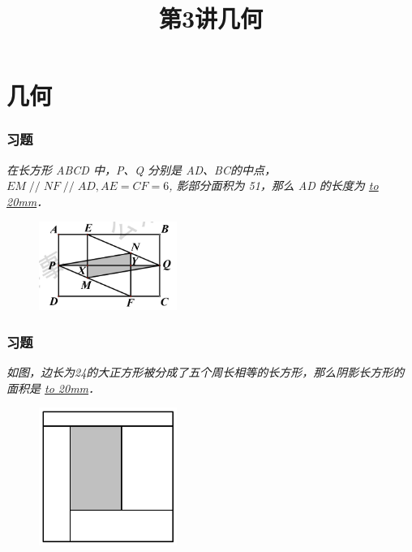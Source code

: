 \section{几何}

\title[第3讲\quad 几何]{第3讲\quad 几何} 
\author{}
\date{}

\begin{frame}
    \titlepage
\end{frame}

\setcounter{framecounter}{0}

\begin{frame}
    \frametitle{习题\theframecounter}
    \vspace*{-3cm}
    \textit{在长方形 ABCD 中，P、Q 分别是 AD、BC的中点， $EM\mathop{//} NF\mathop{//} AD, AE=CF=6$, 影部分面积为 51，那么 AD 的长度为 \underline{\hbox to 20mm{}}．} 
    \begin{figure}[H] 
        \centering
        \includegraphics[width=0.4\textwidth]{./pics/Chapter_3/1.png}
    \end{figure}
\end{frame}

\begin{frame}
    \frametitle{习题\theframecounter}
    \textit{如图，边长为24的大正方形被分成了五个周长相等的长方形，那么阴影长方形的面积是 \underline{\hbox to 20mm{}}．} 
    \begin{figure}[H] 
        \centering
        \includegraphics[width=0.4\textwidth]{./pics/Chapter_3/2.png}
    \end{figure}
\end{frame}

